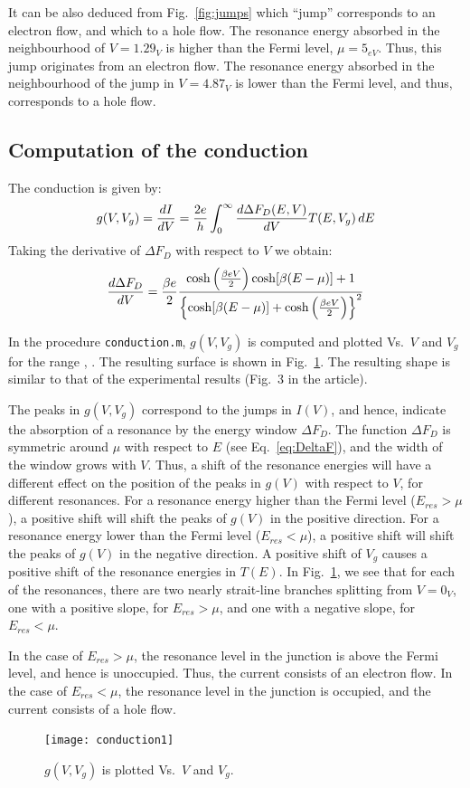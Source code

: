 \documentclass[12pt, a4paper]{article}
\begin{document}
It can be also deduced from Fig.~\ref{fig:jumps} which ``jump'' corresponds to an electron flow, and which to a hole flow. The resonance energy absorbed in the neighbourhood of $V=1.29_V$ is higher than the Fermi level, $\mu=5_{eV}$. Thus, this jump originates from an electron flow. The resonance energy absorbed in the neighbourhood of the jump in $V=4.87_V$ is lower than the Fermi level, and thus, corresponds to a hole flow. 

\subsection{Computation of the conduction}
The conduction is given by:
\begin{equation}\label{eq:g}
	g(V, V_g) = \frac{dI}{dV} = \frac{2e}{h}\int_0^\infty \frac{d\Delta F_D(E, V)}{dV}T(E, V_g)\,dE
\end{equation}
Taking the derivative of $\Delta F_D$ with respect to $V$ we obtain:
\begin{equation}\label{eq:dDeltaFdV}
	\frac{d\Delta F_D}{dV}= \frac{\beta e}{2}\frac{\cosh\left(\frac{\beta eV}{2}\right) \cosh[\beta(E-\mu)] + 1}{\left\lbrace \cosh[\beta(E-\mu)] + \cosh\left(\frac{\beta eV}{2}\right) \right\rbrace^2}
\end{equation}

In the procedure \texttt{conduction.m}, $g(V, V_g)$ is computed and plotted Vs.\ $V$ and $V_g$ for the range , . The resulting surface is shown in Fig.~\ref{fig:g}. The resulting shape is similar to that of the experimental results (Fig.~3 in the article).

The peaks in $g(V, V_g)$ correspond to the jumps in $I(V)$, and hence, indicate the absorption of a resonance by the energy window $\Delta F_D$. The function $\Delta F_D$ is symmetric around $\mu$ with respect to $E$ (see Eq.~\eqref{eq:DeltaF}), and the width of the window grows with $V$. Thus, a shift of the resonance energies will have a different effect on the position of the peaks in $g(V)$ with respect to $V$, for different resonances. For a resonance energy higher than the Fermi level ($E_{res}>\mu$), a positive shift will shift the peaks of $g(V)$ in the positive direction. For a resonance energy lower than the Fermi level ($E_{res}<\mu$), a positive shift will shift the peaks of $g(V)$ in the negative direction. A positive shift of $V_g$ causes a positive shift of the resonance energies in $T(E)$. In Fig.~\ref{fig:g}, we see that for each of the resonances, there are two nearly strait-line branches splitting from $V=0_V$, one with a positive slope, for $E_{res}>\mu$, and one with a negative slope, for $E_{res}<\mu$.

In the case of $E_{res}>\mu$, the resonance level in the junction is above the Fermi level, and hence is unoccupied. Thus, the current consists of an electron flow. In the case of $E_{res}<\mu$, the resonance level in the junction is occupied, and the current consists of a hole flow.

\begin{figure}[htb]
	\centering\texttt{[image: conduction1]}
	\caption{$g(V, V_g)$ is plotted Vs.\ $V$ and $V_g$.}\label{fig:g}
\end{figure}
\end{document}
